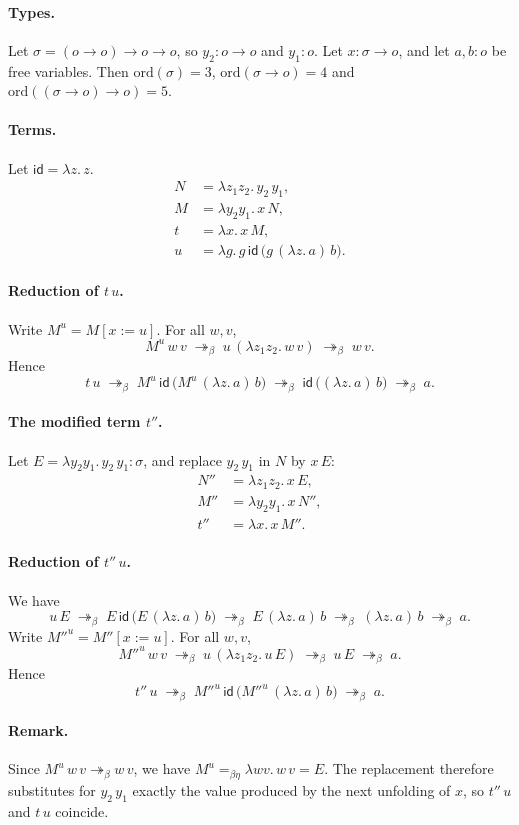 \documentclass{article}
\newcommand{\red}{\twoheadrightarrow_\beta}
\newcommand{\id}{\mathsf{id}}
\begin{document}
\paragraph{Types.}
Let $\sigma = (o\to o)\to o\to o$, so $y_2 : o\to o$ and $y_1 : o$.
Let $x : \sigma\to o$, and let $a, b : o$ be free variables.
Then $\mathrm{ord}(\sigma) = 3$, $\mathrm{ord}(\sigma\to o) = 4$ and
$\mathrm{ord}((\sigma\to o)\to o) = 5$.

\paragraph{Terms.}
Let $\id = \lambda z.\,z$.
\begin{align*}
  N &= \lambda z_1 z_2.\, y_2\, y_1, \\
  M &= \lambda y_2 y_1.\, x\, N, \\
  t &= \lambda x.\, x\, M, \\
  u &= \lambda g.\, g\, \id\, \bigl(g\, (\lambda z.\,a)\, b\bigr).
\end{align*}

\paragraph{Reduction of $t\,u$.}
Write $M^u = M[x := u]$. For all $w, v$,
\[
  M^u\, w\, v \;\red\; u\, (\lambda z_1 z_2.\, w\, v) \;\red\; w\, v .
\]
Hence
\[
  t\,u \;\red\; M^u\, \id\, \bigl(M^u\, (\lambda z.\,a)\, b\bigr)
  \;\red\; \id\, \bigl((\lambda z.\,a)\, b\bigr) \;\red\; a .
\]

\paragraph{The modified term $t''$.}
Let $E = \lambda y_2 y_1.\, y_2\, y_1 : \sigma$, and replace $y_2\,y_1$ in $N$ by $x\,E$:
\begin{align*}
  N'' &= \lambda z_1 z_2.\, x\, E, \\
  M'' &= \lambda y_2 y_1.\, x\, N'', \\
  t'' &= \lambda x.\, x\, M''.
\end{align*}

\paragraph{Reduction of $t''\,u$.}
We have
\[
  u\,E \;\red\; E\, \id\, \bigl(E\, (\lambda z.\,a)\, b\bigr)
  \;\red\; E\, (\lambda z.\,a)\, b \;\red\; (\lambda z.\,a)\, b \;\red\; a .
\]
Write $M''^u = M''[x := u]$. For all $w, v$,
\[
  M''^u\, w\, v \;\red\; u\, (\lambda z_1 z_2.\, u\,E) \;\red\; u\,E \;\red\; a .
\]
Hence
\[
  t''\,u \;\red\; M''^u\, \id\, \bigl(M''^u\, (\lambda z.\,a)\, b\bigr) \;\red\; a .
\]

\paragraph{Remark.}
Since $M^u\,w\,v \red w\,v$, we have $M^u =_{\beta\eta} \lambda w v.\, w\, v = E$.
The replacement therefore substitutes for $y_2\,y_1$ exactly the value produced by the
next unfolding of $x$, so $t''\,u$ and $t\,u$ coincide.
\end{document}
